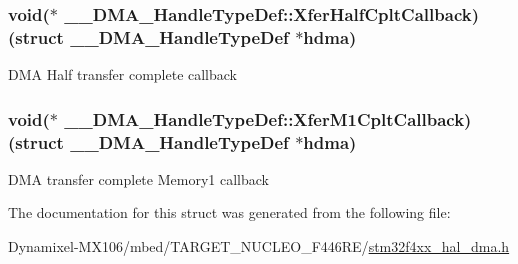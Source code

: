 \subsubsection[{\texorpdfstring{Xfer\+Half\+Cplt\+Callback}{XferHalfCpltCallback}}]{\setlength{\rightskip}{0pt plus 5cm}void($\ast$  \+\_\+\+\_\+\+D\+M\+A\+\_\+\+Handle\+Type\+Def\+::\+Xfer\+Half\+Cplt\+Callback) (struct {\bf \+\_\+\+\_\+\+D\+M\+A\+\_\+\+Handle\+Type\+Def} $\ast$hdma)}\hypertarget{struct_____d_m_a___handle_type_def_a2e343c6a9135222a8efb8ca5bb5dad8c}{}\label{struct_____d_m_a___handle_type_def_a2e343c6a9135222a8efb8ca5bb5dad8c}
D\+MA Half transfer complete callback 
\subsubsection[{\texorpdfstring{Xfer\+M1\+Cplt\+Callback}{XferM1CpltCallback}}]{\setlength{\rightskip}{0pt plus 5cm}void($\ast$  \+\_\+\+\_\+\+D\+M\+A\+\_\+\+Handle\+Type\+Def\+::\+Xfer\+M1\+Cplt\+Callback) (struct {\bf \+\_\+\+\_\+\+D\+M\+A\+\_\+\+Handle\+Type\+Def} $\ast$hdma)}\hypertarget{struct_____d_m_a___handle_type_def_a5968053a3674b44460c1aa150499e01d}{}\label{struct_____d_m_a___handle_type_def_a5968053a3674b44460c1aa150499e01d}
D\+MA transfer complete Memory1 callback 

The documentation for this struct was generated from the following file\+:\begin{DoxyCompactItemize}
\item 
Dynamixel-\/\+M\+X106/mbed/\+T\+A\+R\+G\+E\+T\+\_\+\+N\+U\+C\+L\+E\+O\+\_\+\+F446\+R\+E/\hyperlink{stm32f4xx__hal__dma_8h}{stm32f4xx\+\_\+hal\+\_\+dma.\+h}\end{DoxyCompactItemize}

